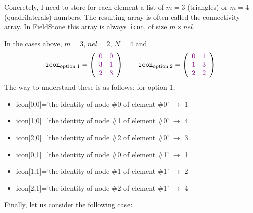 Concretely, I need to store for each element a list of $m=3$ (triangles) or $m=4$ (quadrilaterals) numbers. The resulting array is often called the connectivity array. In FieldStone this array is always {\tt icon}, of size $m \times nel$.

In the cases above, $m=3$, $nel=2$, $N=4$ and 
\[
{\tt icon}_{\rm option\; 1}=
\left(
\begin{array}{cc}
{\color{violet}0}&{\color{violet}0}\\
{\color{violet}3}&{\color{violet}1}\\
{\color{violet}2}&{\color{violet}3}\\
\end{array}
\right)
\qquad
{\tt icon}_{\rm option\; 2}=
\left(
\begin{array}{cc}
{\color{violet}0}&{\color{violet}1}\\
{\color{violet}1}&{\color{violet}3}\\
{\color{violet}2}&{\color{violet}2}
\end{array}
\right)
\]
The way to understand these is as follows: for option 1,
\begin{itemize}
\item
icon[0,0]='the identity of node \#0 of element \#0' $\rightarrow$ {\color{violet}1}
\item
icon[1,0]='the identity of node \#1 of element \#0' $\rightarrow$ {\color{violet}4}
\item
icon[2,0]='the identity of node \#2 of element \#0' $\rightarrow$ {\color{violet}3}
\item
icon[0,1]='the identity of node \#0 of element \#1' $\rightarrow$ {\color{violet}1}
\item
icon[1,1]='the identity of node \#1 of element \#1' $\rightarrow$ {\color{violet}2}
\item
icon[2,1]='the identity of node \#2 of element \#1' $\rightarrow$ {\color{violet}4}
\end{itemize}

Finally, let us consider the following case:

